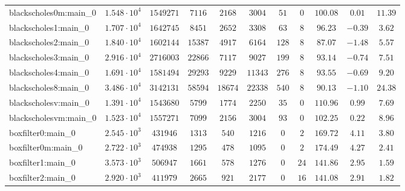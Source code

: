 \begin{tabular}{|l|c|c|c|c|c|c|c|c|c|c|}
blackscholes0m:main\_0         & $ 1.548 \cdot 10^{4} $ & $ 1549271  $ & $ 7116   $ & $ 2168   $ & $ 3004   $ & $ 51   $ & $ 0    $ & $ 100.08      $ & $ 0.01    $ & $ 11.39   $ \\
blackscholes1:main\_0          & $ 1.707 \cdot 10^{4} $ & $ 1642745  $ & $ 8451   $ & $ 2652   $ & $ 3308   $ & $ 63   $ & $ 8    $ & $ 96.23       $ & $ -0.39   $ & $ 3.62    $ \\
blackscholes2:main\_0          & $ 1.840 \cdot 10^{4} $ & $ 1602144  $ & $ 15387  $ & $ 4917   $ & $ 6164   $ & $ 128  $ & $ 8    $ & $ 87.07       $ & $ -1.48   $ & $ 5.57    $ \\
blackscholes3:main\_0          & $ 2.916 \cdot 10^{4} $ & $ 2716003  $ & $ 22866  $ & $ 7117   $ & $ 9027   $ & $ 199  $ & $ 8    $ & $ 93.14       $ & $ -0.74   $ & $ 7.51    $ \\
blackscholes4:main\_0          & $ 1.691 \cdot 10^{4} $ & $ 1581494  $ & $ 29293  $ & $ 9229   $ & $ 11343  $ & $ 276  $ & $ 8    $ & $ 93.55       $ & $ -0.69   $ & $ 9.20    $ \\
blackscholes8:main\_0          & $ 3.486 \cdot 10^{4} $ & $ 3142131  $ & $ 58594  $ & $ 18674  $ & $ 22338  $ & $ 540  $ & $ 8    $ & $ 90.13       $ & $ -1.10   $ & $ 24.38   $ \\
blackscholesv:main\_0          & $ 1.391 \cdot 10^{4} $ & $ 1543680  $ & $ 5799   $ & $ 1774   $ & $ 2250   $ & $ 35   $ & $ 0    $ & $ 110.96      $ & $ 0.99    $ & $ 7.69    $ \\
blackscholesvm:main\_0         & $ 1.523 \cdot 10^{4} $ & $ 1557271  $ & $ 7099   $ & $ 2156   $ & $ 3004   $ & $ 93   $ & $ 0    $ & $ 102.25      $ & $ 0.22    $ & $ 8.96    $ \\
boxfilter0:main\_0             & $ 2.545 \cdot 10^{3} $ & $ 431946   $ & $ 1313   $ & $ 540    $ & $ 1216   $ & $ 0    $ & $ 2    $ & $ 169.72      $ & $ 4.11    $ & $ 3.80    $ \\
boxfilter0m:main\_0            & $ 2.722 \cdot 10^{3} $ & $ 474938   $ & $ 1295   $ & $ 478    $ & $ 1095   $ & $ 0    $ & $ 2    $ & $ 174.49      $ & $ 4.27    $ & $ 2.41    $ \\
boxfilter1:main\_0             & $ 3.573 \cdot 10^{3} $ & $ 506947   $ & $ 1661   $ & $ 578    $ & $ 1276   $ & $ 0    $ & $ 24   $ & $ 141.86      $ & $ 2.95    $ & $ 1.59    $ \\
boxfilter2:main\_0             & $ 2.920 \cdot 10^{3} $ & $ 411979   $ & $ 2665   $ & $ 921    $ & $ 2177   $ & $ 0    $ & $ 16   $ & $ 141.08      $ & $ 2.91    $ & $ 1.82    $ \\

\end{tabular}
